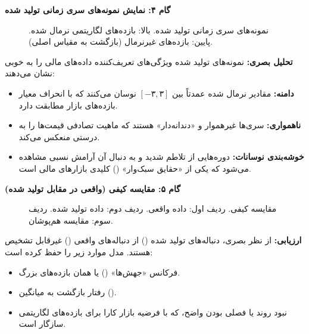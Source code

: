 \textbf{گام ۴: نمایش نمونه‌های سری زمانی تولید شده}
\begin{solutionbox}
    \begin{figure}[H]
        \centering
        \caption{نمونه‌های سری زمانی تولید شده. بالا: بازده‌های لگاریتمی نرمال شده. پایین: بازده‌های غیرنرمال (بازگشت به مقیاس اصلی).}
        \label{fig:fm_samples}
    \end{figure}
    
    

    \textbf{تحلیل بصری:}
    نمونه‌های تولید شده ویژگی‌های تعریف‌کننده داده‌های مالی را به خوبی نشان می‌دهند:
    \begin{itemize}
        \item \textbf{دامنه:} مقادیر نرمال شده عمدتاً بین $[-۳, ۳]$ نوسان می‌کنند که با انحراف معیار بازده‌های بازار مطابقت دارد.
        \item \textbf{ناهمواری:} سری‌ها غیرهموار و «دندانه‌دار» هستند که ماهیت تصادفی قیمت‌ها را به درستی منعکس می‌کند.
        \item \textbf{خوشه‌بندی نوسانات:} دوره‌هایی از تلاطم شدید و به دنبال آن آرامش نسبی مشاهده می‌شود که یکی از «حقایق سبک‌وار» () کلیدی بازارهای مالی است.
    \end{itemize}
\end{solutionbox}

\textbf{گام ۵: مقایسه کیفی (واقعی در مقابل تولید شده)}
\begin{solutionbox}
    \begin{figure}[H]
        \centering
        \caption{مقایسه کیفی. ردیف اول: داده واقعی. ردیف دوم: داده تولید شده. ردیف سوم: مقایسه هم‌پوشان.}
        \label{fig:fm_qualitative}
    \end{figure}
    
    \textbf{ارزیابی:}
    از نظر بصری، دنباله‌های تولید شده () از دنباله‌های واقعی () غیرقابل تشخیص هستند. مدل موارد زیر را حفظ کرده است:
    \begin{itemize}
        \item فرکانس «جهش‌ها» () یا همان بازده‌های بزرگ.
        \item رفتار بازگشت به میانگین ().
        \item نبود روند یا فصلی بودن واضح، که با فرضیه بازار کارا برای بازده‌های لگاریتمی سازگار است.
    \end{itemize}
\end{solutionbox}

